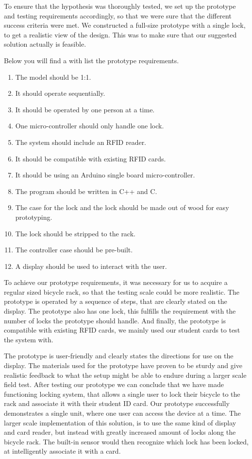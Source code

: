 \documentclass[twoside]{article}
\begin{document}
\begin{multicols}{2}
To ensure that the hypothesis was thoroughly tested, we set up the prototype and testing requirements accordingly, so that we were sure that the different success criteria were met. 
We constructed a full-size prototype with a single lock, to get a realistic view of the design. This was to make sure that our suggested solution actually is feasible.

Below you will find a with list the prototype requirements.
\begin{enumerate}
	
	\item The model should be 1:1.
	\item It should operate sequentially.
	\item It should be operated by one person at a time.
	\item One micro-controller should only handle one lock.
	\item The system should include an RFID reader.
	\item It should be compatible with existing RFID cards.
	\item It should be using an Arduino single board micro-controller.
	\item The program should be written in C++ and C.
	\item The case for the lock and the lock should be made out of wood for easy prototyping.
	\item The lock should be stripped to the rack.
	\item The controller case should be pre-built.
	\item A display should be used to interact with the user.
	
\end{enumerate}

To achieve our prototype requirements, it was necessary for us to acquire a regular sized bicycle rack, so that the testing scale could be more realistic. The prototype is operated by a sequence of steps, that are clearly stated on the display. The prototype also has one lock, this fulfills the requirement with the number of locks the prototype should handle. And finally, the prototype is compatible with existing RFID cards, we mainly used our student cards to test the system with.


The prototype is user-friendly and clearly states the directions for use on the display. The materials used for the prototype have proven to be sturdy and give realistic feedback to what the setup might be able to endure during a larger scale field test.
After testing our prototype we can conclude that we have made functioning locking system, that allows a single user to lock their bicycle to the rack and associate it with their student ID card. Our prototype successfully demonstrates a single unit, where one user can access the device at a time. The larger scale implementation of this solution, is to use the same kind of display and card reader, but instead with greatly increased amount of locks along the bicycle rack. The built-in sensor would then recognize which lock has been locked, at intelligently associate it with a card. 



\end{multicols}
\end{document}
